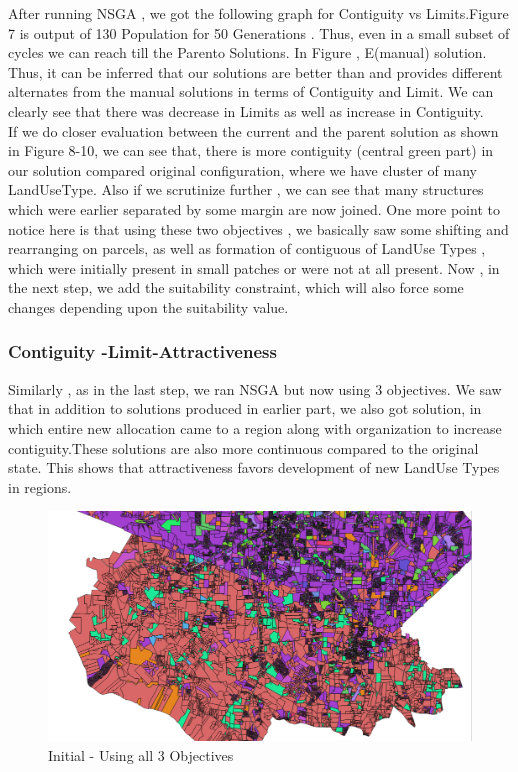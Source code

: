 \documentclass{sig-alternate}
\begin{document}
After running NSGA , we got the following graph for Contiguity vs Limits.Figure 7 is output of 130 Population for 50 Generations . Thus, even in a small subset of cycles we can reach till the Parento Solutions. In Figure , E(manual) solution. Thus, it can be inferred that our solutions are better than and provides different alternates from the manual solutions in terms of Contiguity and Limit. We can clearly see that there was decrease in Limits as well as increase in Contiguity.\\
If we do closer evaluation between the current and the parent solution as shown in Figure 8-10, we can see that, there is more contiguity (central green part) in our solution compared original configuration, where we have cluster of many LandUseType. Also if we scrutinize further , we can see that many structures which were earlier separated by some margin are now joined. One more point to notice here is that using these two objectives , we basically saw some shifting and rearranging on parcels, as well as formation of contiguous of LandUse Types , which were initially present in small patches or were not at all present.  Now , in the next step, we add the suitability constraint, which will also force some changes depending upon the suitability value. \\
\subsubsection{Contiguity -Limit-Attractiveness}
Similarly , as in the last step, we ran NSGA but now using 3 objectives. We saw that in addition to solutions produced in earlier part, we also got solution, in which entire new allocation came to a region along with organization to increase contiguity.These solutions are also more continuous compared to the original state. This shows that attractiveness favors development of new LandUse Types in regions.\\

\begin{figure}
\centering
\includegraphics[width=4.5in]{orig1.png}
\caption{Initial - Using all 3 Objectives}
\end{figure}
\end{document}
